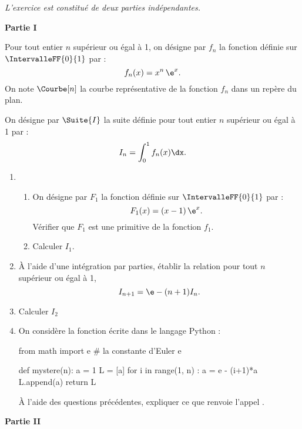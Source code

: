\emph{L’exercice est constitué de deux parties indépendantes.}

\medskip

\textbf{\large Partie I}

\medskip

Pour tout entier $n$ supérieur ou égal à 1, on désigne par $f_n$ la fonction définie sur $\IntervalleFF{0}{1}$ par : \[ f_n(x)=x^n\,\e^{x}. \]
%
On note $\Courbe[n]$ la courbe représentative de la fonction $f_n$ dans un repère \RepereOij{} du plan.

On désigne par $\Suite{I}$ la suite définie pour tout entier $n$ supérieur ou égal à 1 par : \[ I_n = \int_0^1 f_n(x)\dx. \]

\begin{enumerate}
	\item 
	\begin{enumerate}
		\item On désigne par $F_1$  la fonction définie sur $\IntervalleFF{0}{1}$ par : \[ F_1(x)=(x-1)\,\e^{x}.\]
		Vérifier que $F_1$ est une primitive de la fonction $f_1$.
		\item Calculer $I_1$.
	\end{enumerate}
	\item À l’aide d’une intégration par parties, établir la relation pour tout $n$ supérieur ou égal à 1, \[ I_{n+1} = \e - (n+1)I_n. \]
	\item Calculer $I_2$
	\item On considère la fonction  écrite dans le langage \textsf{Python} :
	
	\begin{CodePiton}[Alignement=center,Largeur=13cm,Gobble=tabs]{}
	from math import e # la constante d'Euler e
	
	def mystere(n):
		a = 1
		L = [a]
		for i in range(1, n) :
			a = e - (i+1)*a
			L.append(a)
		return L
	\end{CodePiton}
	
	À l’aide des questions précédentes, expliquer ce que renvoie l’appel .
\end{enumerate}

\pagebreak

\textbf{\large Partie II}

